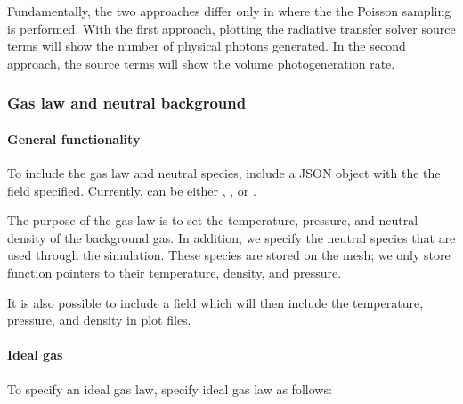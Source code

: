 \documentclass[letterpaper,10pt,english]{sphinxmanual}
\begin{document}
Fundamentally, the two approaches differ only in where the the Poisson sampling is performed.
With the first approach, plotting the radiative transfer solver source terms will show the number of physical photons generated.
In the second approach, the source terms will show the volume photo\sphinxhyphen{}generation rate.


\subsubsection{Gas law and neutral background}
\label{\detokenize{Applications/CdrPlasmaModel:gas-law-and-neutral-background}}

\paragraph{General functionality}
\label{\detokenize{Applications/CdrPlasmaModel:general-functionality}}
To include the gas law and neutral species, include a JSON object  with the the field  specified.
Currently,  can be either , , or .

The purpose of the gas law is to set the temperature, pressure, and neutral density of the background gas.
In addition, we specify the neutral species that are used through the simulation.
These species are  stored on the mesh; we only store function pointers to their temperature, density, and pressure.

It is also possible to include a field  which will then include the temperature, pressure, and density in plot files.


\paragraph{Ideal gas}
\label{\detokenize{Applications/CdrPlasmaModel:ideal-gas}}
To specify an ideal gas law, specify ideal gas law as follows:

\begin{sphinxVerbatim}[commandchars=\\\{\},formatcom=\scriptsize]
     
     
     
\end{sphinxVerbatim}
\end{document}

